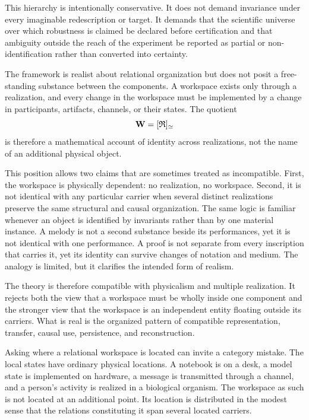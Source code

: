 This hierarchy is intentionally conservative. It does not demand invariance
under every imaginable redescription or target. It demands that the scientific
universe over which robustness is claimed be declared before certification and
that ambiguity outside the reach of the experiment be reported as partial or
non-identification rather than converted into certainty.


The framework is realist about relational organization but does not posit a free-standing substance
between the components. A workspace exists only through a realization, and every change in the
workspace must be implemented by a change in participants, artifacts, channels, or their states. The
quotient
\[
\mathbf W=[\mathfrak R]_{\simeq}
\]
is therefore a mathematical account of identity across realizations, not the name of an additional
physical object.

This position allows two claims that are sometimes treated as incompatible. First, the workspace is
physically dependent: no realization, no workspace. Second, it is not identical with any particular
carrier when several distinct realizations preserve the same structural and causal organization. The same
logic is familiar whenever an object is identified by invariants rather than by one material instance. A
melody is not a second substance beside its performances, yet it is not identical with one performance.
A proof is not separate from every inscription that carries it, yet its identity can survive changes of
notation and medium. The analogy is limited, but it clarifies the intended form of realism.

The theory is therefore compatible with physicalism and multiple realization. It rejects both the view
that a workspace must be wholly inside one component and the stronger view that the workspace is an
independent entity floating outside its carriers. What is real is the organized pattern of compatible
representation, transfer, causal use, persistence, and reconstruction.


Asking where a relational workspace is located can invite a category mistake. The local states have
ordinary physical locations. A notebook is on a desk, a model state is implemented on hardware, a
message is transmitted through a channel, and a person's activity is realized in a biological organism.
The workspace as such is not located at an additional point. Its location is distributed in the modest
sense that the relations constituting it span several located carriers.

